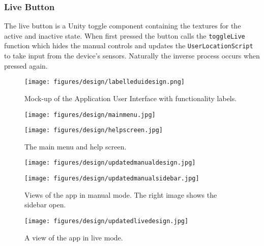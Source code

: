 \documentclass[12pt, a4paper]{article}
\begin{document}
\subsubsection{Live Button}
The live button is a Unity toggle component containing the textures for the active and inactive state. When first pressed the button calls the \verb|toggleLive| function which hides the manual controls and updates the \verb|UserLocationScript| to take input from the device's sensors. Naturally the inverse process occurs when pressed again.

\begin{figure}[h]
    \centering
    \texttt{[image: figures/design/labelleduidesign.png]}
        \caption{Mock-up of the Application User Interface with functionality labels.}
        \label{fig:uimockup}
\end{figure}

\begin{figure}[H]
\centering
\begin{minipage}{.5\textwidth}
  \centering
  \texttt{[image: figures/design/mainmenu.jpg]}
\end{minipage}%
\begin{minipage}{.5\textwidth}
  \centering
  \texttt{[image: figures/design/helpscreen.jpg]}
\end{minipage}
\caption{The main menu and help screen.}
\label{fig:menuandhelp}
\end{figure}

\begin{figure}[H]
\centering
\begin{minipage}{.5\textwidth}
  \centering
  \texttt{[image: figures/design/updatedmanualdesign.jpg]}

\end{minipage}%
\begin{minipage}{.5\textwidth}
  \centering
  \texttt{[image: figures/design/updatedmanualsidebar.jpg]}
\end{minipage}
  \caption{Views of the app in manual mode. The right image shows the sidebar open.}
  \label{fig:manualview}
\end{figure}

\begin{figure}[h]
    \centering
    \texttt{[image: figures/design/updatedlivedesign.jpg]}
        \caption{A view of the app in live mode.}
        \label{fig:liveview}
\end{figure}
\end{document}
